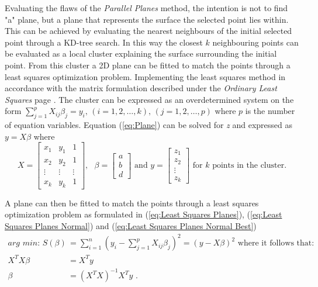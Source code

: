 \documentclass[%
]{USN-MSc}
\begin{document}
Evaluating the flaws of the \textit{Parallel Planes} method, the intention is not to find "a" plane, but a plane that represents the surface the selected point lies within. This can be achieved by evaluating the nearest neighbours of the initial selected point through a KD-tree search. In this way the closest \(k\) neighbouring points can be evaluated as a local cluster explaining the surface surrounding the initial point. From this cluster a 2D plane can be fitted to match the points through a least squares optimization problem. 
Implementing the least squares method in accordance with the matrix formulation described under the \textit{Ordinary Least Squares} page \cite{Ordinary-Least-Squares}. The cluster can be expressed as an overdetermined system on the form \(\sum_{j=1}^p X_{ij}\beta_j=y_i\text{, } (i=1,2,\dots,k)\text{, } (j=1,2,\dots,p) \) where \(p\) is the number of equation variables. Equation (\ref{eq:Plane}) can be solved for \textit{z} and expressed as \(y=X\beta\) where
\begin{equation}
    X = \begin{bmatrix} x_{1} & y_1 & 1 \\ x_{2} & y_2 & 1 \\ \vdots & \vdots & \vdots \\ x_k & y_k & 1 \end{bmatrix}, \text{ } \beta = \begin{bmatrix} a \\ b \\ d \end{bmatrix}     \text{ and }
    y = \begin{bmatrix} z_{1} \\ z_{2} \\ \vdots \\ z_k \end{bmatrix} \text{ for \(k\) points in the cluster.}
\end{equation}

A plane can then be fitted to match the points through a least squares optimization problem as formulated in (\ref{eq:Least Squares Planes}), (\ref{eq:Least Squares Planes Normal}) and (\ref{eq:Least Squares Planes Normal Best})
\begin{align}
    \label{eq:Least Squares Planes}
    \textit{arg min:  } S(\beta) &=\sum_{i=1}^n (y_i-\sum_{j=1}^p X_{ij}\beta_j)^2 =(y-X\beta)^2 \text{ where it follows that:} \\
    \label{eq:Least Squares Planes Normal}
    X^TX\beta & = X^Ty \\
    \label{eq:Least Squares Planes Normal Best}
    \beta &= (X^TX)^{-1}X^Ty \text{  .}
\end{align}
\end{document}
